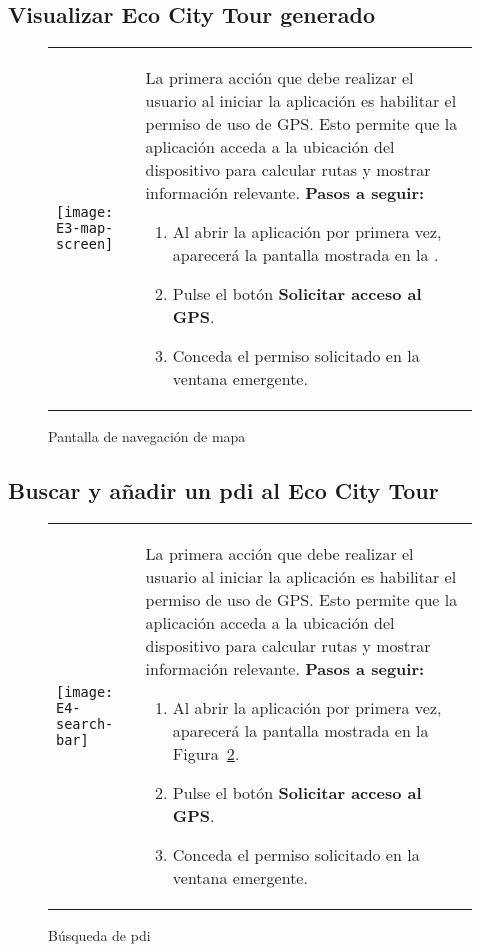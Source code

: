 \subsection{Visualizar Eco City Tour generado}
\begin{figure}[h!]
	\centering
	\begin{tabular}{m{} m{}}
		\texttt{[image: E3-map-screen]} & 
		\vspace{-10pt}
		
		La primera acción que debe realizar el usuario al iniciar la aplicación es habilitar el permiso de uso de GPS. Esto permite que la aplicación acceda a la ubicación del dispositivo para calcular rutas y mostrar información relevante.
		\textbf{Pasos a seguir:}
		\begin{enumerate}
			\item Al abrir la aplicación por primera vez, aparecerá la pantalla mostrada en la .
			\item Pulse el botón \textbf{Solicitar acceso al GPS}.
			\item Conceda el permiso solicitado en la ventana emergente.
		\end{enumerate}		
	\end{tabular}
	\caption{Pantalla de navegación de mapa}
	\label{fig:navegacionMapa}
\end{figure}

\subsection{Buscar y añadir un \acrlong{pdi} al Eco City Tour}
\begin{figure}[h!]
	\centering
	\begin{tabular}{m{} m{}}
		\texttt{[image: E4-search-bar]} & 
		\vspace{-10pt}
		
		La primera acción que debe realizar el usuario al iniciar la aplicación es habilitar el permiso de uso de GPS. Esto permite que la aplicación acceda a la ubicación del dispositivo para calcular rutas y mostrar información relevante.
		\textbf{Pasos a seguir:}
		\begin{enumerate}
			\item Al abrir la aplicación por primera vez, aparecerá la pantalla mostrada en la Figura~\ref{fig:busquedaPDI}.
			\item Pulse el botón \textbf{Solicitar acceso al GPS}.
			\item Conceda el permiso solicitado en la ventana emergente.
		\end{enumerate}		
	\end{tabular}
	\caption{Búsqueda de \acrshort{pdi}}
	\label{fig:busquedaPDI}
\end{figure}

